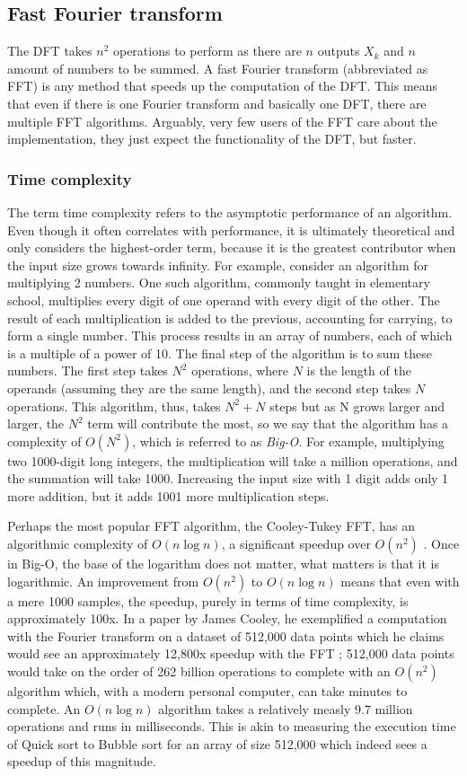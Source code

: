 \subsection{Fast Fourier transform}
The DFT takes $n^2$ operations to perform as there are $n$ outputs $X_k$ and $n$ amount of numbers to be summed. A fast Fourier transform (abbreviated as FFT) is any method that speeds up the computation of the DFT. This means that even if there is one Fourier transform and basically one DFT, there are multiple FFT algorithms. Arguably, very few users of the FFT care about the implementation, they just expect the functionality of the DFT, but faster. 

\subsubsection{Time complexity}
The term time complexity refers to the asymptotic performance of an algorithm. Even though it often correlates with performance, it is ultimately theoretical and only considers the highest-order term, because it is the greatest contributor when the input size grows towards infinity. For example, consider an algorithm for multiplying 2 numbers. One such algorithm, commonly taught in elementary school, multiplies every digit of one operand with every digit of the other. The result of each multiplication is added to the previous, accounting for carrying, to form a single number. This process results in an array of numbers, each of which is a multiple of a power of 10. The final step of the algorithm is to sum these numbers. The first step takes $N^2$ operations, where $N$ is the length of the operands (assuming they are the same length), and the second step takes $N$ operations. This algorithm, thus, takes $N^2+N$ steps but as N grows larger and larger, the $N^2$ term will contribute the most, so we say that the algorithm has a complexity of $O(N^2)$, which is referred to as \textit{Big-O}. For example, multiplying two 1000-digit long integers, the multiplication will take a million operations, and the summation will take 1000. Increasing the input size with 1 digit adds only 1 more addition, but it adds 1001 more multiplication steps.

Perhaps the most popular FFT algorithm, the Cooley-Tukey FFT, has an algorithmic complexity of $O(n \log n)$, a significant speedup over $O(n^2)$ \cite{Randhawa2018}. Once in Big-O, the base of the logarithm does not matter, what matters is that it is logarithmic. An improvement from $O(n^2)$ to $O(n \log n)$ means that even with a mere 1000 samples, the speedup, purely in terms of time complexity, is approximately 100x. In a paper by James Cooley, he exemplified a computation with the Fourier transform on a dataset of 512,000 data points which he claims would see an approximately 12,800x speedup with the FFT \cite{Cooley1987}; 512,000 data points would take on the order of 262 billion operations to complete with an $O(n^2)$ algorithm which, with a modern personal computer, can take minutes to complete. An $O(n \log n)$ algorithm takes a relatively measly 9.7 million operations and runs in milliseconds. This is akin to measuring the execution time of Quick sort to Bubble sort for an array of size 512,000 which indeed sees a speedup of this magnitude.

